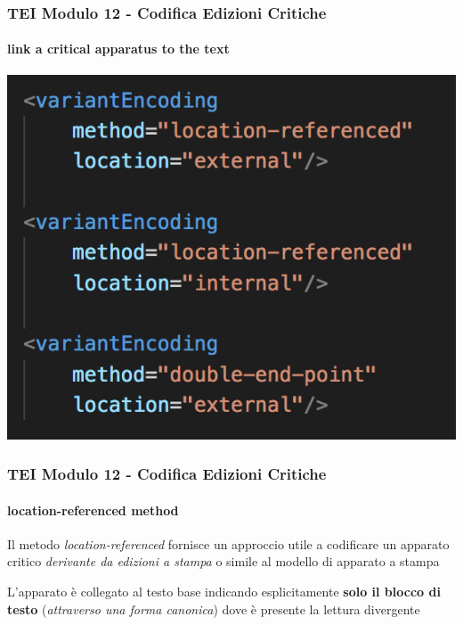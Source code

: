 \begin{frame}
    \frametitle{TEI Modulo 12 - Codifica Edizioni Critiche}
    \framesubtitle{link a critical apparatus to the text}
    \addtocounter{nframe}{1}
    

    \begin{center}
       \includegraphics[width=.95\textwidth]{imgs/variantEncoding.png}
    \end{center}

\end{frame}



\begin{frame}
    \frametitle{TEI Modulo 12 - Codifica Edizioni Critiche}
    \framesubtitle{location-referenced method}
    \addtocounter{nframe}{1}
    



    \begin{block}
        Il metodo \textit{location-referenced} fornisce un approccio utile a codificare un apparato critico \textit{derivante da edizioni a stampa} o simile al modello di apparato a stampa
    \end{block}
    \begin{block}
         L'apparato è collegato al testo base indicando esplicitamente \textbf{solo il blocco di testo} (\textit{attraverso una forma canonica}) dove è presente la lettura divergente
     \end{block}

\end{frame}



